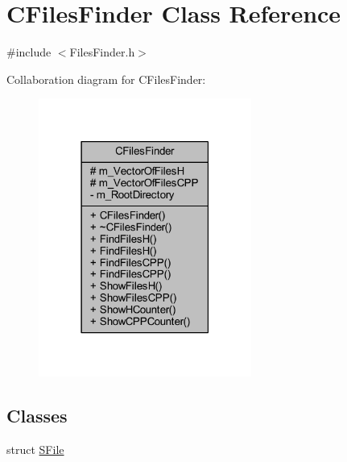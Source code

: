 \hypertarget{class_c_files_finder}{\section{C\+Files\+Finder Class Reference}
\label{class_c_files_finder}
}


{\ttfamily \#include $<$Files\+Finder.\+h$>$}



Collaboration diagram for C\+Files\+Finder\+:
\nopagebreak
\begin{figure}[H]
\begin{center}
\leavevmode
\includegraphics[width=198pt]{class_c_files_finder__coll__graph}
\end{center}
\end{figure}
\subsection*{Classes}
\begin{DoxyCompactItemize}
\item 
struct \hyperlink{struct_c_files_finder_1_1_s_file}{S\+File}
\end{DoxyCompactItemize}
